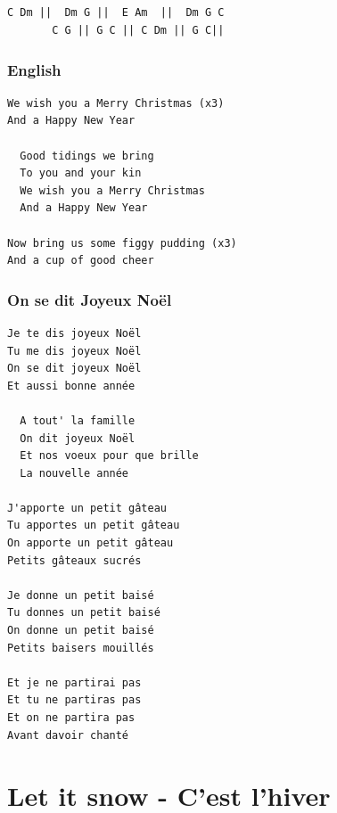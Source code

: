 \documentclass[
]{article}
\begin{document}
\hypertarget{section-4}{%
\subsection*{}\label{section-4}}

\begin{verbatim}
C Dm ||  Dm G ||  E Am  ||  Dm G C 
       C G || G C || C Dm || G C|| 
\end{verbatim}

\hypertarget{english-2}{%
\subsubsection*{English}\label{english-2}}

\begin{verbatim}
We wish you a Merry Christmas (x3)
And a Happy New Year

  Good tidings we bring
  To you and your kin
  We wish you a Merry Christmas
  And a Happy New Year

Now bring us some figgy pudding (x3)
And a cup of good cheer
\end{verbatim}

\hypertarget{on-se-dit-joyeux-nouxebl}{%
\subsubsection*{On se dit Joyeux Noël}\label{on-se-dit-joyeux-nouxebl}}

\begin{verbatim}
Je te dis joyeux Noël 
Tu me dis joyeux Noël 
On se dit joyeux Noël 
Et aussi bonne année

  A tout' la famille
  On dit joyeux Noël
  Et nos voeux pour que brille
  La nouvelle année

J'apporte un petit gâteau 
Tu apportes un petit gâteau 
On apporte un petit gâteau 
Petits gâteaux sucrés

Je donne un petit baisé
Tu donnes un petit baisé
On donne un petit baisé
Petits baisers mouillés

Et je ne partirai pas 
Et tu ne partiras pas 
Et on ne partira pas 
Avant davoir chanté
\end{verbatim}

\hypertarget{let-it-snow---cest-lhiver}{%
\section{Let it snow - C'est l'hiver}\label{let-it-snow---cest-lhiver}}
\end{document}
